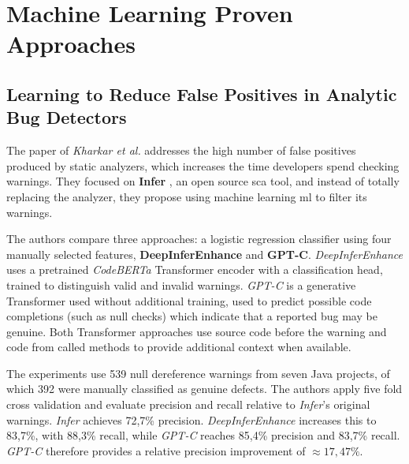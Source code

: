 \section{Machine Learning Proven Approaches} \label{sec:mlstaticdetection}



\subsection{Learning to Reduce False Positives in Analytic Bug Detectors}

\hspace{0.6em} The paper of \textit{Kharkar et al.} \cite{paper1_kharkarlearning2022} addresses the high number of false positives produced by static analyzers, which increases the time developers spend checking warnings. They focused on \textbf{Infer} \cite{meta_infer}, an open source \gls{sca} tool, and instead of totally replacing the analyzer, they propose using machine learning \gls{ml} to filter its warnings.

\hspace{0.6em} The authors compare three approaches: a logistic regression classifier using four manually selected features, \textbf{DeepInferEnhance} and \textbf{GPT-C}. \textit{DeepInferEnhance} uses a pretrained \textit{CodeBERTa} \cite{husain2019codesearchnet,feng2020codebert,huggingface2020codeberta} Transformer encoder with a classification head, trained to distinguish valid and invalid warnings. \textit{GPT-C} is a generative Transformer used without additional training, used to predict possible code completions (such as null checks) which indicate that a reported bug may be genuine. Both Transformer approaches use source code before the warning and code from called methods to provide additional context when available.

\hspace{0.6em} The experiments use 539 null dereference warnings from seven Java projects, of which 392 were manually classified as genuine defects. The authors apply five fold cross validation and evaluate precision and recall relative to \textit{Infer}'s original warnings. \textit{Infer} achieves 72,7\% precision. \textit{DeepInferEnhance} increases this to 83,7\%, with 88,3\% recall, while \textit{GPT-C} reaches 85,4\% precision and 83,7\% recall. \textit{GPT-C} therefore provides a relative precision improvement of $\approx 17,47\%$.

